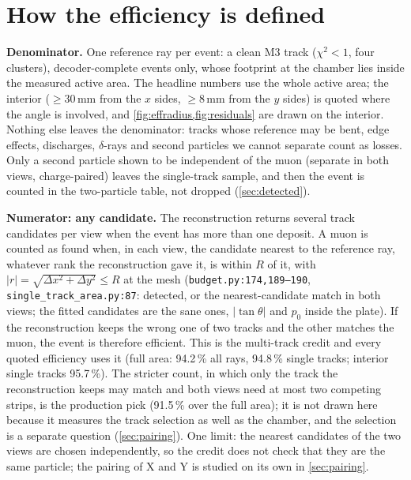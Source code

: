 \section{How the efficiency is defined}\label{app:effdef}

\textbf{Denominator.} One reference ray per event: a clean M3 track ($\chi^2<1$, four clusters), decoder-complete
events only, whose footprint at the chamber lies inside the measured active area. The headline numbers use the whole
active area; the interior (${\ge}30$\,mm from the $x$ sides, ${\ge}8$\,mm from the $y$ sides) is quoted where the angle
is involved, and \cref{fig:effradius,fig:residuals} are drawn on the interior. Nothing else leaves the denominator:
tracks whose reference may be bent, edge effects, discharges, $\delta$-rays and second particles we cannot separate
count as losses. Only a second particle shown to be independent of the muon (separate in both views, charge-paired) leaves
the single-track sample, and then the event is counted in the two-particle table, not dropped (\cref{sec:detected}).

\textbf{Numerator: any candidate.} The reconstruction returns several track candidates per view when the event has
more than one deposit. A muon is counted as found when, in each view, the candidate nearest to the reference ray, whatever
rank the reconstruction gave it, is within $R$ of it, with $|r|=\sqrt{\Delta x^2+\Delta y^2}\le R$ at the mesh
(\texttt{budget.py:174,189--190}, \texttt{single\_track\_area.py:87}: detected, or the nearest-candidate match in both
views; the fitted candidates are the sane ones, $|\tan\theta|$ and $p_0$ inside the plate). If the reconstruction keeps the
wrong one of two tracks and the other matches the muon, the event is therefore efficient. This is the multi-track credit
and every quoted efficiency uses it (full area: 94.2\,\% all rays, 94.8\,\% single tracks; interior single tracks 95.7\,\%).
The stricter count, in which only the track the reconstruction keeps may match and both views need at most two competing
strips, is the production pick (91.5\,\% over the full area); it is not drawn here because it measures the track selection
as well as the chamber, and the selection is a separate question (\cref{sec:pairing}). One limit: the nearest candidates of
the two views are chosen independently, so the credit does not check that they are the same particle; the pairing of X and
Y is studied on its own in \cref{sec:pairing}.

